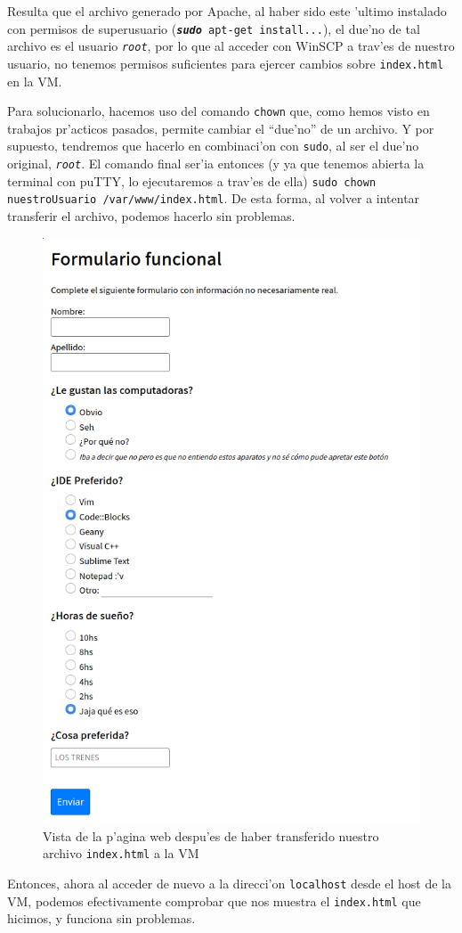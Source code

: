 \documentclass[11pt]{article}
\begin{document}
	Resulta que el archivo generado por Apache, al haber sido este 'ultimo instalado con permisos de superusuario (\texttt{\emph{\textbf{sudo}} apt-get install...}), el due'no de tal archivo es el usuario \texttt{\emph{root}}, por lo que al acceder con WinSCP a trav'es de nuestro usuario, no tenemos permisos suficientes para ejercer cambios sobre \texttt{index.html} en la VM.
	
	Para solucionarlo, hacemos uso del comando \texttt{chown} que, como hemos visto en trabajos pr'acticos pasados, permite cambiar el ``due'no'' de un archivo. Y por supuesto, tendremos que hacerlo en combinaci'on con \texttt{sudo}, al ser el due'no original, \texttt{\emph{root}}. El comando final ser'ia entonces (y ya que tenemos abierta la terminal con puTTY, lo ejecutaremos a trav'es de ella)  \verb|sudo chown nuestroUsuario /var/www/index.html|. De esta forma, al volver a intentar transferir el archivo, podemos hacerlo sin problemas.
	
	\begin{figure}[H]
		\centering \captionsetup{justification=centering}
		\includegraphics[width=.55\linewidth]{Images/WinSCP/fig5}
		\caption{Vista de la p'agina web despu'es de haber transferido nuestro archivo \texttt{index.html} a la VM}
		\label{fig:index_ours_code}
	\end{figure}

	Entonces, ahora al acceder de nuevo a la direcci'on \texttt{localhost} desde el host de la VM, podemos efectivamente comprobar que nos muestra el \texttt{index.html} que hicimos, y funciona sin problemas.
\end{document}
